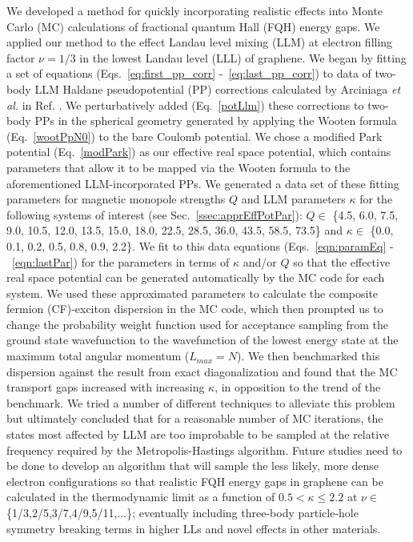 \doublespacing

We developed a method for quickly incorporating realistic effects into Monte Carlo (MC) calculations of fractional quantum Hall (FQH) energy gaps. We applied our method to the effect Landau level mixing (LLM) at electron filling factor $\nu=1/3$ in the lowest Landau level (LLL) of graphene. We began by fitting a set of equations (Eqs.~\ref{eq:first_pp_corr} -~\ref{eq:last_pp_corr}) to data of two-body LLM Haldane pseudopotential (PP) corrections calculated by Arciniaga \textit{et al.} in Ref. \cite{arciniaga}. We perturbatively added (Eq.~\ref{potLlm}) these corrections to two-body PPs in the spherical geometry generated by applying the Wooten formula (Eq.~\ref{wootPpN0}) to the bare Coulomb potential. We chose a modified Park potential (Eq.~\ref{modPark}) as our effective real space potential, which contains parameters that allow it to be mapped via the Wooten formula to the aforementioned LLM-incorporated PPs. We generated a data set of these fitting parameters for magnetic monopole strengths $Q$ and LLM parameters $\kappa$ for the following systems of interest (see Sec.~\ref{ssec:apprEffPotPar}): $Q\in$ \{4.5, 6.0, 7.5, 9.0, 10.5, 12.0, 13.5, 15.0, 18.0, 22.5, 28.5, 36.0, 43.5, 58.5, 73.5\} and $\kappa\in$ \{0.0, 0.1, 0.2, 0.5, 0.8, 0.9, 2.2\}. We fit to this data equations (Eqs.~\ref{eqn:paramEq} -~\ref{eqn:lastPar}) for the parameters in terms of $\kappa$ and/or $Q$ so that the effective real space potential can be generated automatically by the MC code for each system. We used these approximated parameters to calculate the composite fermion (CF)-exciton dispersion in the MC code, which then prompted us to change the probability weight function used for acceptance sampling from the ground state wavefunction to the wavefunction of the lowest energy state at the maximum total angular momentum ($L_{max}=N$). We then benchmarked this dispersion against the result from exact diagonalization and found that the MC transport gaps increased with increasing $\kappa$, in opposition to the trend of the benchmark. We tried a number of different techniques to alleviate this problem but ultimately concluded that for a reasonable number of MC iterations, the states most affected by LLM are too improbable to be sampled at the relative frequency required by the Metropolis-Hastings algorithm. Future studies need to be done to develop an algorithm that will sample the less likely, more dense electron configurations so that realistic FQH energy gaps in graphene can be calculated in the thermodynamic limit as a function of $0.5<\kappa\leq2.2$ at $\nu\in$ \{1/3,2/5,3/7,4/9,5/11,...\}; eventually including three-body particle-hole symmetry breaking terms in higher LLs and novel effects in other materials.

\singlespacing